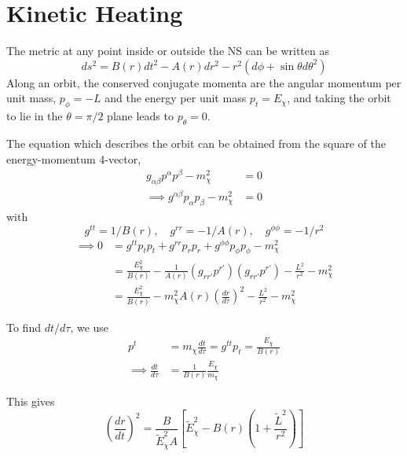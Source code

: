 \section{Kinetic Heating}

The metric at any point inside or outside the NS can be written as 
\begin{equation}
    ds^2 = B(r) dt^2 - A(r) dr^2 - r^2( d\phi + \sin\theta d\theta^2)
\end{equation}
Along an orbit, the conserved conjugate momenta are the angular momentum per unit mass, $p_\phi = -L$ and the energy per unit mass $p_t = E_\chi$, and taking the orbit to lie in the $\theta = \pi/2$ plane leads to $p_\theta = 0$. 

The equation which describes the orbit can be obtained from the square of the energy-momentum 4-vector,
\begin{align}
    g_{\alpha\beta} p^\alpha p^\beta - m_\chi^2 & = 0\\
    \implies g^{\alpha\beta} p_\alpha p_\beta - m_\chi^2 & = 0
\end{align}
with
\begin{equation}    
g^{tt} = 1/B(r),\quad g^{rr} = -1/A(r),\quad g^{\phi \phi} = -1/r^2
\end{equation}
\begin{align}
    \implies 0 & = g^{tt} p_t p_t + g^{rr} p_r p_r + g^{\phi\phi} p_\phi p_\phi - m_\chi^2 \\
    & = \frac{E_\chi^2}{B(r)} - \frac{1}{A(r)} \left( g_{rr'} p^{r'} \right)\left( g_{rr'} p^{r'} \right) - \frac{L^2}{r^2} - m_\chi^2 \\
    & = \frac{E_\chi^2}{B(r)} - m_\chi^2 A(r) \left( \frac{dr}{d\tau} \right)^2 - \frac{L^2}{r^2} - m_\chi^2
\end{align}

To find $dt/d\tau$, we use
\begin{align}
    p^t & = m_\chi \frac{dt}{d\tau} = g^{tt}p_t = \frac{E_\chi}{B(r)}\\
    \implies \frac{dt}{d\tau} & = \frac{1}{B(r)}\frac{E_\chi}{m_\chi}
\end{align}

This gives
\begin{equation}
    \left (\frac{dr}{dt} \right)^2 = \frac{B}{\tilde E_\chi^2 A} \left[\tilde E_\chi^2- B(r) \left(  1 + \frac{\tilde L^2}{r^2} \right) \right]\label{eq:drdt2GR}
\end{equation}

